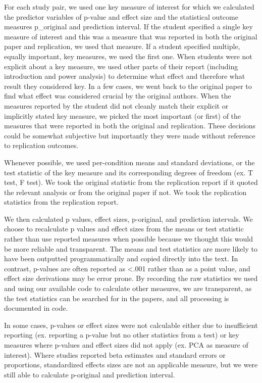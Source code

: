 \documentclass[
  english,
  a4paper,
]{article}
\begin{document}
For each study pair, we used one key measure of interest for which we calculated the predictor variables of p-value and effect size and the statistical outcome measures p\_original and prediction interval. If the student specified a single key measure of interest and this was a measure that was reported in both the original paper and replication, we used that measure. If a student specified multiple, equally important, key measures, we used the first one. When students were not explicit about a key measure, we used other parts of their report (including introduction and power analysis) to determine what effect and therefore what result they considered key. In a few cases, we went back to the original paper to find what effect was considered crucial by the original authors. When the measures reported by the student did not cleanly match their explicit or implicitly stated key measure, we picked the most important (or first) of the measures that were reported in both the original and replication. These decisions could be somewhat subjective but importantly they were made without reference to replication outcomes.

Whenever possible, we used per-condition means and standard deviations, or the test statistic of the key measure and its corresponding degrees of freedom (ex. T test, F test). We took the original statistic from the replication report if it quoted the relevant analysis or from the original paper if not. We took the replication statistics from the replication report.

We then calculated p values, effect sizes, p-original, and prediction intervals. We choose to recalculate p values and effect sizes from the means or test statistic rather than use reported measures when possible because we thought this would be more reliable and transparent. The means and test statistics are more likely to have been outputted programmatically and copied directly into the text. In contrast, p-values are often reported as \textless.001 rather than as a point value, and effect size derivations may be error prone. By recording the raw statistics we used and using our available code to calculate other measures, we are transparent, as the test statistics can be searched for in the papers, and all processing is documented in code.

In some cases, p-values or effect sizes were not calculable either due to insufficient reporting (ex. reporting a p-value but no other statistics from a test) or key measures where p-values and effect sizes did not apply (ex. PCA as measure of interest). Where studies reported beta estimates and standard errors or proportions, standardized effects sizes are not an applicable measure, but we were still able to calculate p-original and prediction interval.
\end{document}
